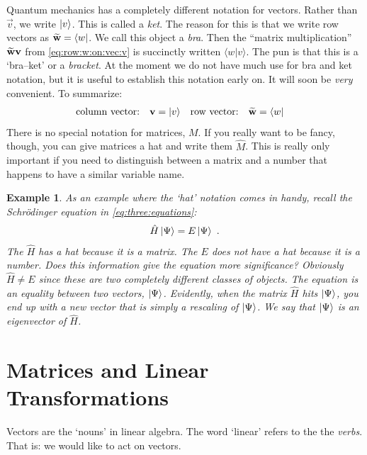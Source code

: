 \documentclass[12pt]{article}
\newtheorem{example}{Example}[section]
\begin{document}
Quantum mechanics has a completely different notation for vectors. Rather than $\vec{v}$, we write $\left|v\right\rangle$. This is called a \emph{ket}. The reason for this is that we write row vectors as $\widetilde{\mathbf{w}} = \left\langle w\right|$. We call this object a \emph{bra}. Then the ``matrix multiplication'' $\widetilde{\mathbf{w}}\mathbf{v}$ from \eqref{eq:row:w:on:vec:v} is succinctly written $\langle w|v\rangle$. The pun is that this is a `bra--ket' or a \emph{bracket}. At the moment we do not have much use for bra and ket notation, but it is useful to establish this notation early on. It will soon be \emph{very} convenient. To summarize:
\begin{align}
    \textnormal{column vector:}\quad \mathbf{v} &= \left|v\right\rangle
    &
    \textnormal{row vector:}\quad \widetilde{\mathbf{w}} &= \left\langle w\right|
\end{align}
There is no special notation for matrices, $M$. If you really want to be fancy, though, you can give matrices a hat and write them $\hat M$. This is really only important if you need to distinguish between a matrix and a number that happens to have a similar variable name. 

\begin{example}
As an example where the `hat' notation comes in handy, recall the Schr\"odinger equation in \eqref{eq:three:equations}:
\begin{align}
    \hat H \left|\Psi\right\rangle = E \left|\Psi\right\rangle \ .
\end{align}
The $\hat H$ has a hat because it is a matrix. The $E$ does not have a hat because it is a number. Does this information give the equation more significance? Obviously $\hat H \neq E$ since these are two completely different classes of objects. The equation is an equality between two vectors, $\left|\Psi\right\rangle$. Evidently, when the matrix $\hat H$ hits $\left|\Psi\right\rangle$, you end up with a new vector that is simply a rescaling of $\left|\Psi\right\rangle$. We say that $\left|\Psi\right\rangle$ is an \emph{eigenvector} of $\hat H$. 
\end{example}



\section{Matrices and Linear Transformations}

Vectors are the `nouns' in linear algebra. The word `linear' refers to the the \emph{verbs}. That is: we would like to act on vectors. 
\end{document}
